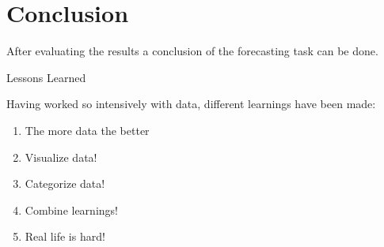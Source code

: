 \chapter{Conclusion}\label{chapter:Conclusion}
After evaluating the results a conclusion of the forecasting task can be done.
\caption{Lessons Learned}
Having worked so intensively with data, different learnings have been made:

\begin{enumerate}
\item The more data the better
\item Visualize data!
\item Categorize data!
\item Combine learnings!
\item Real life is hard!
\end{enumerate}

